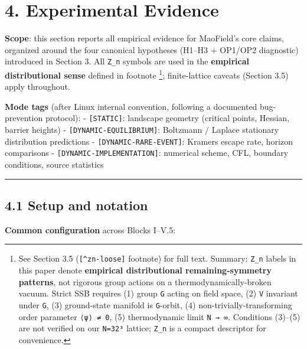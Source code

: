\documentclass[
]{article}
\begin{document}
\hypertarget{experimental-evidence}{%
\section{4. Experimental Evidence}\label{experimental-evidence}}

\textbf{Scope}: this section reports all empirical evidence for
MaoField's core claims, organized around the four canonical hypotheses
(H1--H3 + OP1/OP2 diagnostic) introduced in Section 3. All \texttt{Z\_n}
symbols are used in the \textbf{empirical distributional sense} defined
in footnote \footnote{See Section 3.5 (\texttt{{[}\^{}zn-loose{]}}
  footnote) for full text. Summary: \texttt{Z\_n} labels in this paper
  denote \textbf{empirical distributional remaining-symmetry patterns},
  not rigorous group actions on a thermodynamically-broken vacuum.
  Strict SSB requires (1) group \texttt{G} acting on field space, (2)
  \texttt{V} invariant under \texttt{G}, (3) ground-state manifold is
  \texttt{G}-orbit, (4) non-trivially-transforming order parameter
  \texttt{⟨ψ⟩\ ≠\ 0}, (5) thermodynamic limit \texttt{N\ →\ ∞}.
  Conditions (3)--(5) are not verified on our \texttt{N=32³} lattice;
  \texttt{Z\_n} is a compact descriptor for convenience.};
finite-lattice caveats (Section 3.5) apply throughout.

\textbf{Mode tags} (after Linux internal convention, following a
documented bug-prevention protocol): - \texttt{{[}STATIC{]}}: landscape
geometry (critical points, Hessian, barrier heights) -
\texttt{{[}DYNAMIC-EQUILIBRIUM{]}}: Boltzmann / Laplace stationary
distribution predictions - \texttt{{[}DYNAMIC-RARE-EVENT{]}}: Kramers
escape rate, horizon comparisons -
\texttt{{[}DYNAMIC-IMPLEMENTATION{]}}: numerical scheme, CFL, boundary
conditions, source statistics

\begin{center}\rule{0.5\linewidth}{0.5pt}\end{center}

\hypertarget{setup-and-notation}{%
\subsection{4.1 Setup and notation}\label{setup-and-notation}}

\textbf{Common configuration} across Blocks I--V.5:
\end{document}
